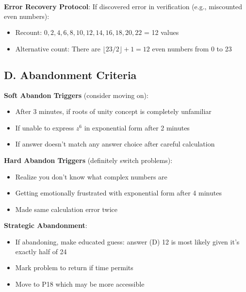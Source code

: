 \documentclass[]{article}
\begin{document}
\begin{competitionbox}
\textbf{Error Recovery Protocol}: If discovered error in verification (e.g., miscounted even numbers):
\begin{itemize}[leftmargin=*]
    \item Recount: $0, 2, 4, 6, 8, 10, 12, 14, 16, 18, 20, 22$ = 12 values
    \item Alternative count: There are $\lfloor 23/2 \rfloor + 1 = 12$ even numbers from 0 to 23
\end{itemize}

\subsection*{D. Abandonment Criteria}

\textbf{Soft Abandon Triggers} (consider moving on):
\begin{itemize}[leftmargin=*]
    \item After 3 minutes, if roots of unity concept is completely unfamiliar
    \item If unable to express $z^6$ in exponential form after 2 minutes
    \item If answer doesn't match any answer choice after careful calculation
\end{itemize}

\textbf{Hard Abandon Triggers} (definitely switch problems):
\begin{itemize}[leftmargin=*]
    \item Realize you don't know what complex numbers are
    \item Getting emotionally frustrated with exponential form after 4 minutes
    \item Made same calculation error twice
\end{itemize}

\textbf{Strategic Abandonment}: 
\begin{itemize}[leftmargin=*]
    \item If abandoning, make educated guess: answer (D) 12 is most likely given it's exactly half of 24
    \item Mark problem to return if time permits
    \item Move to P18 which may be more accessible
\end{itemize}
\end{competitionbox}
\end{document}
